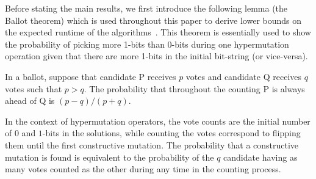 \documentclass[lettersize,journal]{IEEEtran}
\begin{document}
Before stating the main results, we first introduce the following lemma (the Ballot theorem) which is used throughout this paper to derive lower bounds on the expected runtime of the algorithms~\cite{feller1968,JansenZarges2011,CorusOlivetoYazdani2019TCS}.  This theorem is essentially used to show the probability of picking more 1-bits than 0-bits during one hypermutation operation given that there are more 1-bits in the initial bit-string (or vice-versa). 
%
\begin{lemma}  \label{lem:ballot} 
In a ballot, suppose that candidate P receives $p$ votes and candidate Q receives $q$ votes such that $p>q$. The probability that throughout the counting P is always ahead of Q is $(p-q)/(p+q)$. 
\end{lemma}

{\color{black}In the context of hypermutation operators, the vote counts are the initial number of $0$ and $1$-bits in the solutions, while counting the votes correspond to flipping them until the first constructive mutation. The probability that a constructive mutation is found is equivalent to the probability of the $q$ candidate having as many votes counted as the other during any time in the counting process.}
\end{document}
